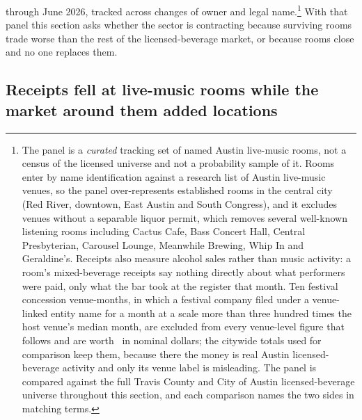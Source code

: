 through June 2026, tracked across changes of owner and legal name.\footnote{The panel is a
\emph{curated} tracking set of named Austin live-music rooms, not a census of
the licensed universe and not a probability sample of it. Rooms enter by name
identification against a research list of Austin live-music venues, so the panel
over-represents established rooms in the central city (Red River, downtown,
East Austin and South Congress), and it excludes venues without a separable
liquor permit, which removes several well-known listening rooms including
Cactus Cafe, Bass Concert Hall, Central Presbyterian, Carousel Lounge,
Meanwhile Brewing, Whip In and Geraldine's. Receipts also measure alcohol
sales rather than music activity: a room's mixed-beverage receipts say nothing
directly about what performers were paid, only what the bar took at the register
that month. Ten festival concession venue-months, in which a festival company
filed under a venue-linked entity name for a month at a scale more than three
hundred times the host venue's median month, are excluded from every venue-level
figure that follows and are worth \NVenueFestivalDollarsExcluded\ in nominal
dollars; the citywide totals used for comparison keep them, because there the
money is real Austin licensed-beverage activity and only its venue label is
misleading. The panel is compared against the full Travis County and City of
Austin licensed-beverage universe throughout this section, and each comparison
names the two sides in matching terms.} With that panel this section asks
whether the sector is contracting because surviving rooms trade worse than the
rest of the licensed-beverage market, or because rooms close and no one replaces
them.

\subsection{Receipts fell at live-music rooms while the market around them added locations}

